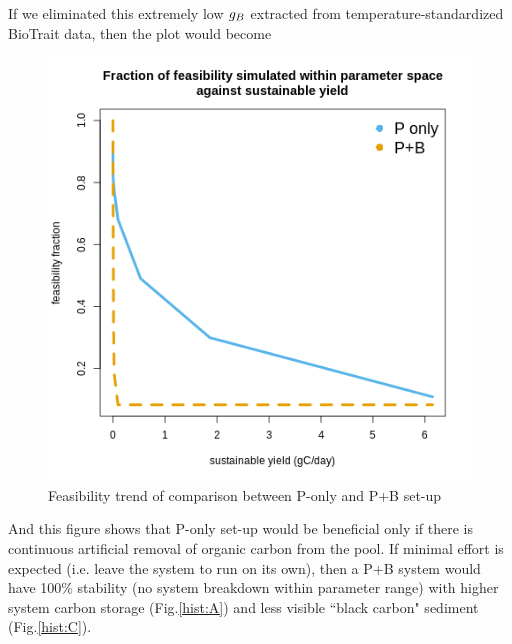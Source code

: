 \documentclass[../thesis.tex]{subfiles} %
\begin{document}
If we eliminated this extremely low $g_B$ extracted from temperature-standardized BioTrait data, then the plot would become
\begin{figure}[H]
    \centering
    \includegraphics[width=.5\linewidth]{result/MSY_SustainableYield_sySmall.png}
    \caption{Feasibility trend of comparison between P-only and P+B set-up}
    \label{fig:feasibility}
\end{figure}

And this figure shows that P-only set-up would be beneficial only if there is continuous artificial removal of organic carbon from the pool.  If minimal effort is expected (i.e. leave the system to run on its own), then a P+B system would have 100\% stability (no system breakdown within parameter range) with higher system carbon storage (Fig.\ref{hist:A}) and less visible ``black carbon" sediment (Fig.\ref{hist:C}).
\end{document}
